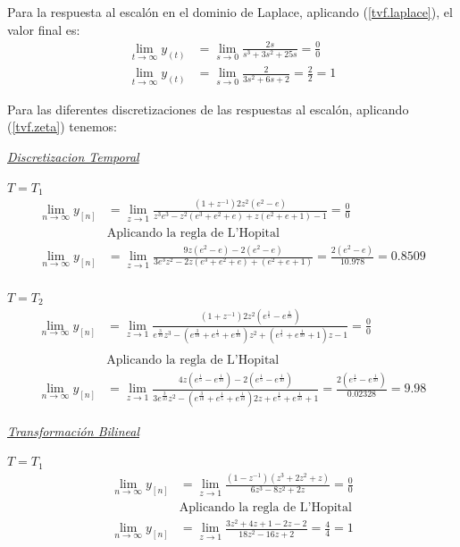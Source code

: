 \documentclass[a4paper,12pt]{report}
\begin{document}
\begin{enumerate}[label=\alph*), left=0pt]
                Para la respuesta al escalón en el dominio de Laplace, aplicando (\ref{tvf.laplace}), el valor final es:
                \begin{align*}
                    \lim_{t \to \infty} y_{(t)} &= \lim_{s \to 0} \frac{2s}{s^3 + 3s^2 + 25s} = \frac{0}{0}\\
                    \lim_{t \to \infty} y_{(t)} &= \lim_{s \to 0} \frac{2}{3s^2 + 6s + 2} = \frac{2}{2} = 1
                \end{align*}

                Para las diferentes discretizaciones de las respuestas al escalón, aplicando (\ref{tvf.zeta}) tenemos:

                {\centering\underline{\textit{Discretizacion Temporal}}\par}
                $T = T_1$
                \begin{align*}
                    \lim_{n \to \infty} y_{[n]} &= \lim_{z \to 1} \frac{(1 + z^{-1}) 2z^2 (e^2 - e)}{z^3 e^3 - z^2(e^3+e^2+e)+z(e^2+e+1)-1} = \frac{0}{0}\\
                      &\text{Aplicando la regla de L'Hopital}\\
                    \lim_{n \to \infty} y_{[n]} &= \lim_{z \to 1} \frac{9z(e^2-e) - 2(e^2-e)}{3e^3z^2-2z(e^3+e^2+e)+(e^2+e+1)} = \frac{2(e^2-e)}{10.978} = 0.8509
                \end{align*}\\

                $T = T_2$
                \begin{align*}
                    \lim_{n \to \infty} y_{[n]} &= \lim_{z \to 1} \frac{(1 + z^{-1}) 2 z^2 (e^{\frac{1}{5}} - e^{\frac{1}{10}})}{e^{\frac{3}{10}}z^3 - (e^{\frac{3}{10}} + e^{\frac{1}{5}} + e^{\frac{1}{10}})z^2
                        + (e^{\frac{1}{5}} + e^{\frac{1}{10}} + 1)z - 1} = \frac{0}{0}\\\\
                      &\text{Aplicando la regla de L'Hopital}\\
                    \lim_{n \to \infty} y_{[n]} &= \lim_{z \to 1} \frac{4z (e^{\frac{1}{5}} - e^{\frac{1}{10}}) - 2(e^{\frac{1}{5}} - e^{\frac{1}{10}})}{3e^{\frac{3}{10}}z^2 - (e^{\frac{3}{10}} + e^{\frac{1}{5}} + e^{\frac{1}{10}})2z + e^{\frac{1}{5}} + e^{\frac{1}{10}} + 1} = \frac{2(e^{\frac{1}{5}} - e^{\frac{1}{10}})}{0.02328} = 9.98
                \end{align*}

                {\centering\underline{\textit{Transformación Bilineal}}\par}
                $T = T_1$
                \begin{align*}
                    \lim_{n \to \infty} y_{[n]} &= \lim_{z\to{1}} \frac{(1-z^{-1})(z^3+2z^2+z)}{6z^3-8z^2+2z} = \frac{0}{0}\\
                      &\text{Aplicando la regla de L'Hopital}\\
                    \lim_{n \to \infty} y_{[n]} &= \lim_{z\to{1}} \frac{3z^2+4z+1-2z-2}{18z^2-16z+2} = \frac{4}{4} = 1
                \end{align*}


\end{enumerate}
\end{document}
